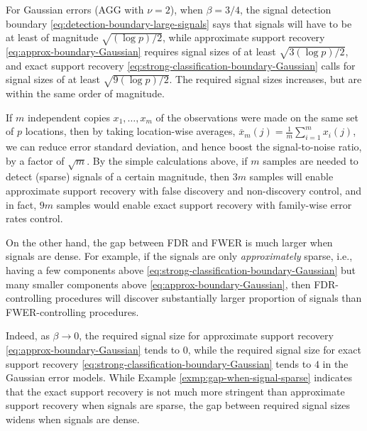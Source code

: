 \begin{example} \label{exmp:gap-when-signal-sparse}
For Gaussian errors (AGG with $\nu = 2$), when $\beta = 3/4$, the signal detection boundary \eqref{eq:detection-boundary-large-signals} says that signals will have to be at least of magnitude $\sqrt{(\log{p})/2}$, 
while approximate support recovery \eqref{eq:approx-boundary-Gaussian} requires signal sizes of at least $\sqrt{3(\log{p})/2}$, 
and exact support recovery \eqref{eq:strong-classification-boundary-Gaussian} calls for signal sizes of at least $\sqrt{9(\log{p})/2}$. 
The required signal sizes increases, but are within the same order of magnitude.

If $m$ independent copies $x_1,\ldots,x_m$ of the observations were made on the same set of $p$ locations, then by taking location-wise averages, $\overline{x}_{m}(j) = \frac{1}{m}\sum_{i=1}^{m} x_i(j)$,
we can reduce error standard deviation, and hence boost the signal-to-noise ratio, by a factor of $\sqrt{m}$.
By the simple calculations above, if $m$ samples are needed to detect (sparse) signals of a certain magnitude, then $3m$ samples will enable approximate support recovery with false discovery and non-discovery control, and in fact, $9m$ samples would enable exact support recovery with family-wise error rates control.
\end{example}

On the other hand, the gap between FDR and FWER is much larger when signals are dense.
For example, if the signals are only \emph{approximately} sparse, i.e., having a few components above \eqref{eq:strong-classification-boundary-Gaussian} but many smaller components above  \eqref{eq:approx-boundary-Gaussian}, then FDR-controlling procedures will discover substantially larger proportion of signals than FWER-controlling procedures.

Indeed, as $\beta\to0$, the required signal size for approximate support recovery \eqref{eq:approx-boundary-Gaussian} tends to 0, while the required signal size for exact support recovery \eqref{eq:strong-classification-boundary-Gaussian} tends to $4$ in the Gaussian error models.
While Example \ref{exmp:gap-when-signal-sparse} indicates that the exact support recovery is not much more stringent than approximate support recovery when signals are sparse, the gap between required signal sizes widens when signals are dense. 

